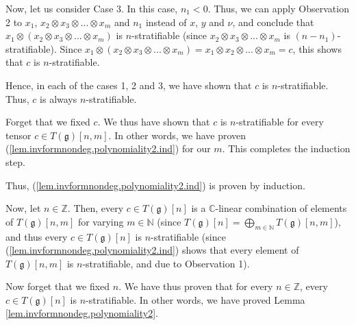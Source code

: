 \documentclass
[numbers=enddot,12pt,final,onecolumn,german,notitlepage]{scrartcl}%
\theoremstyle{definition}
\begin{document}
Now, let us consider Case 3. In this case, $n_{1}<0$. Thus, we can apply
Observation 2 to $x_{1}$, $x_{2}\otimes x_{3}\otimes...\otimes x_{m}$ and
$n_{1}$ instead of $x$, $y$ and $\nu$, and conclude that $x_{1}\otimes\left(
x_{2}\otimes x_{3}\otimes...\otimes x_{m}\right)  $ is $n$-stratifiable (since
$x_{2}\otimes x_{3}\otimes...\otimes x_{m}$ is $\left(  n-n_{1}\right)
$-stratifiable). Since $x_{1}\otimes\left(  x_{2}\otimes x_{3}\otimes
...\otimes x_{m}\right)  =x_{1}\otimes x_{2}\otimes...\otimes x_{m}=c$, this
shows that $c$ is $n$-stratifiable.

Hence, in each of the cases 1, 2 and 3, we have shown that $c$ is
$n$-stratifiable. Thus, $c$ is always $n$-stratifiable.

Forget that we fixed $c$. We thus have shown that $c$ is $n$-stratifiable for
every tensor $c\in T\left(  \mathfrak{g}\right)  \left[  n,m\right]  $. In
other words, we have proven (\ref{lem.invformnondeg.polynomiality2.ind}) for
our $m$. This completes the induction step.

Thus, (\ref{lem.invformnondeg.polynomiality2.ind}) is proven by induction.

Now, let $n\in\mathbb{Z}$. Then, every $c\in T\left(  \mathfrak{g}\right)
\left[  n\right]  $ is a $\mathbb{C}$-linear combination of elements of
$T\left(  \mathfrak{g}\right)  \left[  n,m\right]  $ for varying
$m\in\mathbb{N}$ (since $T\left(  \mathfrak{g}\right)  \left[  n\right]
=\bigoplus\limits_{m\in\mathbb{N}}T\left(  \mathfrak{g}\right)  \left[
n,m\right]  $), and thus every $c\in T\left(  \mathfrak{g}\right)  \left[
n\right]  $ is $n$-stratifiable (since
(\ref{lem.invformnondeg.polynomiality2.ind}) shows that every element of
$T\left(  \mathfrak{g}\right)  \left[  n,m\right]  $ is $n$-stratifiable, and
due to Observation 1).

Now forget that we fixed $n$. We have thus proven that for every
$n\in\mathbb{Z}$, every $c\in T\left(  \mathfrak{g}\right)  \left[  n\right]
$ is $n$-stratifiable. In other words, we have proved Lemma
\ref{lem.invformnondeg.polynomiality2}.
\end{document}
